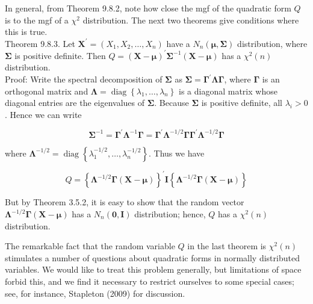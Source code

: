 In general, from Theorem 9.8.2, note how close the mgf of the quadratic form $Q$ is to the mgf of a $\chi^{2}$ distribution. The next two theorems give conditions where this is true.\\
Theorem 9.8.3. Let $\mathbf{X}^{\prime}=\left(X_{1}, X_{2}, \ldots, X_{n}\right)$ have a $N_{n}(\boldsymbol{\mu}, \boldsymbol{\Sigma})$ distribution, where $\boldsymbol{\Sigma}$ is positive definite. Then $Q=(\mathbf{X}-\boldsymbol{\mu})^{\prime} \boldsymbol{\Sigma}^{-1}(\mathbf{X}-\boldsymbol{\mu})$ has a $\chi^{2}(n)$ distribution.\\
Proof: Write the spectral decomposition of $\boldsymbol{\Sigma}$ as $\boldsymbol{\Sigma}=\boldsymbol{\Gamma}^{\prime} \boldsymbol{\Lambda} \boldsymbol{\Gamma}$, where $\boldsymbol{\Gamma}$ is an orthogonal matrix and $\boldsymbol{\Lambda}=\operatorname{diag}\left\{\lambda_{1}, \ldots, \lambda_{n}\right\}$ is a diagonal matrix whose diagonal entries are the eigenvalues of $\boldsymbol{\Sigma}$. Because $\boldsymbol{\Sigma}$ is positive definite, all $\lambda_{i}>0$. Hence we can write

$$
\boldsymbol{\Sigma}^{-1}=\boldsymbol{\Gamma}^{\prime} \boldsymbol{\Lambda}^{-1} \boldsymbol{\Gamma}=\boldsymbol{\Gamma}^{\prime} \boldsymbol{\Lambda}^{-1 / 2} \boldsymbol{\Gamma} \boldsymbol{\Gamma}^{\prime} \boldsymbol{\Lambda}^{-1 / 2} \boldsymbol{\Gamma}
$$

where $\boldsymbol{\Lambda}^{-1 / 2}=\operatorname{diag}\left\{\lambda_{1}^{-1 / 2}, \ldots, \lambda_{n}^{-1 / 2}\right\}$. Thus we have

$$
Q=\left\{\boldsymbol{\Lambda}^{-1 / 2} \boldsymbol{\Gamma}(\mathbf{X}-\boldsymbol{\mu})\right\}^{\prime} \mathbf{I}\left\{\boldsymbol{\Lambda}^{-1 / 2} \boldsymbol{\Gamma}(\mathbf{X}-\boldsymbol{\mu})\right\}
$$

But by Theorem 3.5.2, it is easy to show that the random vector $\boldsymbol{\Lambda}^{-1 / 2} \boldsymbol{\Gamma}(\mathbf{X}-\boldsymbol{\mu})$ has a $N_{n}(\mathbf{0}, \mathbf{I})$ distribution; hence, $Q$ has a $\chi^{2}(n)$ distribution.

The remarkable fact that the random variable $Q$ in the last theorem is $\chi^{2}(n)$ stimulates a number of questions about quadratic forms in normally distributed\\
variables. We would like to treat this problem generally, but limitations of space forbid this, and we find it necessary to restrict ourselves to some special cases; see, for instance, Stapleton (2009) for discussion.

